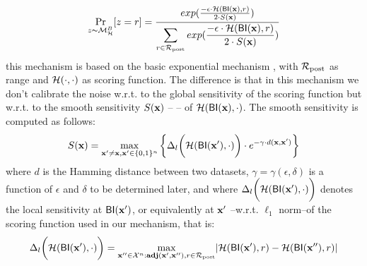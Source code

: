\documentclass[sigconf, anonymous]{acmart}
\begin{document}
\begin{equation*}
\underset{z \thicksim \mathcal{M}^{B}_{\mathcal{H}}}{\Pr}[z=r] = \frac {exp(\frac{-\epsilon\cdot\mathcal{H}(\mathsf{BI}(\textbf{x}),r)}{2\cdot S(\textbf{x})})}
{\displaystyle\sum_{r\in\mathcal{R}_{\textup{post}}} exp(\frac{-\epsilon\cdot\mathcal{H}(\mathsf{BI}(\textbf{x}),r)}{2\cdot S(\textbf{x})})}
\end{equation*}
this mechanism is based on the basic exponential mechanism \cite{talwar}, with $\mathcal{R}_{\textup{post}}$ as range and $\mathcal{H}(\cdot,\cdot)$ as scoring function.
The difference is that in this mechanism we don't calibrate the noise w.r.t. to the global sensitivity of the scoring function but w.r.t. to the smooth sensitivity $S(\textbf{x})$
-- \citet{nissim2007smooth}-- of $\mathcal{H}(\mathsf{BI}(\textbf{x}), \cdot)$. The smooth sensitivity is computed as follows:
\begin{equation}
  \label{eq:smooth}
   S(\textbf{x})=\max_{\textbf{x}' \neq \textbf{x}, \textbf{x}' \in \{0,1\}^{n}}\bigg \{\Delta_{l}\bigg (\mathcal{H}(\mathsf{BI}(\textbf{x}'),\cdot)\bigg )\cdot e^{-\gamma\cdot d(\textbf{x}, \textbf{x}')}\bigg\}
\end{equation}
 where $d$ is the Hamming distance between two datasets,  $\gamma = \gamma(\epsilon, \delta)$ is a function
 of $\epsilon$ and $\delta$ to be determined later, and where $\Delta_{l}\bigg (\mathcal{H}(\mathsf{BI}(\textbf{x}'),\cdot)\bigg )$
 denotes the local sensitivity at $\mathsf{BI}(\textbf{x}')$, or equivalently at $\textbf{x}'$ --w.r.t. $\ell_1$ norm--of the scoring function used in our mechanism, that is:
 \begin{equation*}
 \Delta_{l}\bigg (\mathcal{H}(\mathsf{BI}(\textbf{x}'),\cdot)\bigg )=\max_{\textbf{x}'' \in \mathcal{X}^n:\textbf{adj}(\textbf{x}',\textbf{x}''), r\in \mathcal{R}_{\textup{post}}}\lvert \mathcal{H}(\mathsf{BI}(\textbf{x}'), r) - \mathcal{H}(\mathsf{BI}(\textbf{x}''), r)\rvert
\end{equation*}
\end{document}
